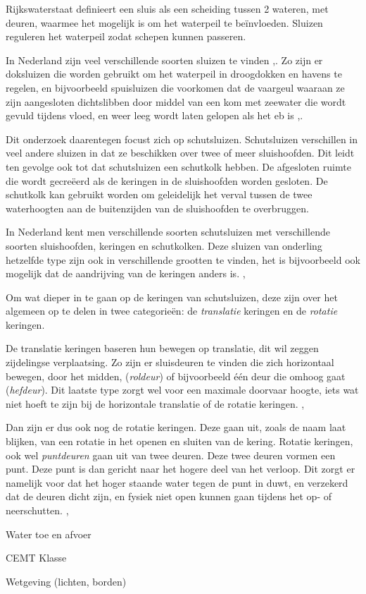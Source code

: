 \documentclass[../verslag.tex]{subfiles}
\begin{document}
Rijkswaterstaat definieert een sluis als een scheiding tussen 2 wateren, met deuren, waarmee het mogelijk is om het waterpeil te beïnvloeden. Sluizen reguleren het waterpeil zodat schepen kunnen passeren. \cite{rws_2022}

In Nederland zijn veel verschillende soorten sluizen te vinden \cite{wsnoorderzijlvest_2021},\cite{arends_1994}. Zo zijn er doksluizen die worden gebruikt om het waterpeil in droogdokken en havens te regelen, en bijvoorbeeld spuisluizen die voorkomen dat de vaargeul waaraan ze zijn aangesloten dichtslibben door middel van een kom met zeewater die wordt gevuld tijdens vloed, en weer leeg wordt laten gelopen als het eb is \cite{wsnoorderzijlvest_2021},\cite{arends_1994}.

Dit onderzoek daarentegen focust zich op schutsluizen. Schutsluizen verschillen in veel andere sluizen in dat ze beschikken over twee of meer sluishoofden. Dit leidt ten gevolge ook tot dat schutsluizen een schutkolk hebben. De afgesloten ruimte die wordt gecreëerd als de keringen in de sluishoofden worden gesloten. De schutkolk kan gebruikt worden om geleidelijk het verval tussen de twee waterhoogten aan de buitenzijden van de sluishoofden te overbruggen. \cite{bezuijen_2000}

In Nederland kent men verschillende soorten schutsluizen met verschillende soorten sluishoofden, keringen en schutkolken. Deze sluizen van onderling hetzelfde type zijn ook in verschillende grootten te vinden, het is bijvoorbeeld ook mogelijk dat de aandrijving van de keringen anders is. \cite{bezuijen_2000}, \cite{arends_1994}

Om wat dieper in te gaan op de keringen van schutsluizen, deze zijn over het algemeen op te delen in twee categorieën: de \emph{translatie} keringen en de \emph{rotatie} keringen. \cite{bezuijen_2000}

De translatie keringen baseren hun bewegen op translatie, dit wil zeggen zijdelingse verplaatsing. Zo zijn er sluisdeuren te vinden die zich horizontaal bewegen, door het midden, (\emph{roldeur}) of bijvoorbeeld één deur die omhoog gaat (\emph{hefdeur}). Dit laatste type zorgt wel voor een maximale doorvaar hoogte, iets wat niet hoeft te zijn bij de horizontale translatie of de rotatie keringen. \cite{bezuijen_2000}, \cite{arends_1994}

Dan zijn er dus ook nog de rotatie keringen. Deze gaan uit, zoals de naam laat blijken, van een rotatie in het openen en sluiten van de kering. Rotatie keringen, ook wel \emph{puntdeuren} gaan uit van twee deuren. Deze twee deuren vormen een punt. Deze punt is dan gericht naar het hogere deel van het verloop. Dit zorgt er namelijk voor dat het hoger staande water tegen de punt in duwt, en verzekerd dat de deuren dicht zijn, en fysiek niet open kunnen gaan tijdens het op- of neerschutten. \cite{bezuijen_2000}, \cite{arends_1994} 

Water toe en afvoer

CEMT Klasse

Wetgeving (lichten, borden)
\end{document}
